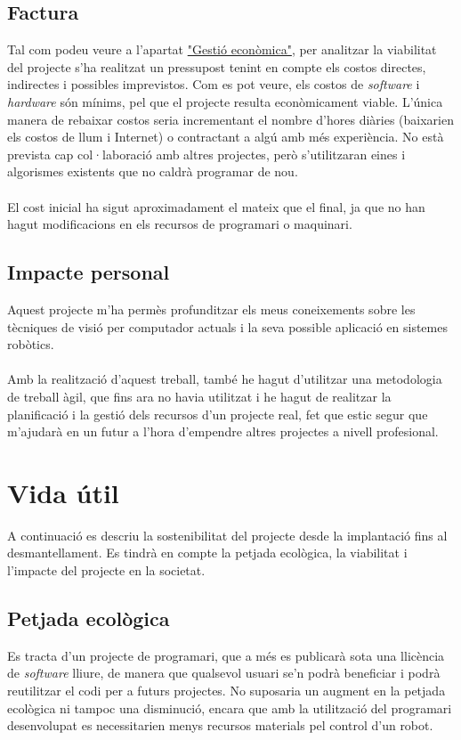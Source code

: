 	\subsection{Factura}
		Tal com podeu veure a l'apartat \hyperref[sec:Costos]{"Gestió econòmica"}, per analitzar la viabilitat del projecte s'ha realitzat un pressupost tenint en compte els costos directes, indirectes
		i possibles imprevistos. Com es pot veure, els costos de \textit{software} i \textit{hardware} són mínims, pel que el projecte resulta econòmicament viable.
		L'única manera de rebaixar costos seria incrementant el nombre d'hores diàries (baixarien els costos de llum i Internet) o contractant a algú amb més experiència.
		No està prevista cap col·laboració amb altres projectes, però s'utilitzaran eines i algorismes existents que no caldrà programar de nou.\\\\
		El cost inicial ha sigut aproximadament el mateix que el final, ja que no han hagut modificacions en els recursos de programari o maquinari.

	\subsection{Impacte personal}
		Aquest projecte m'ha permès profunditzar els meus coneixements sobre les tècniques de visió per computador actuals i la seva possible aplicació en sistemes robòtics.\\\\
		Amb la realització d'aquest treball, també he hagut d'utilitzar una metodologia de treball àgil, que fins ara no havia utilitzat i he hagut de realitzar la planificació i la gestió dels recursos
		d'un projecte real, fet que estic segur que m'ajudarà en un futur a l'hora d'empendre altres projectes a nivell profesional.

\section{Vida útil}
	A continuació es descriu la sostenibilitat del projecte desde la implantació fins al desmantellament. Es tindrà en compte la petjada ecològica, la viabilitat i l'impacte del projecte en la societat.
	\subsection{Petjada ecològica}
		Es tracta d'un projecte de programari, que a més es publicarà sota una llicència de \textit{software} lliure, de manera que qualsevol usuari se'n podrà beneficiar i podrà reutilitzar el
		codi per a futurs projectes. No suposaria un augment en la petjada ecològica ni tampoc una disminució, encara que amb la utilització del programari desenvolupat es necessitarien menys recursos materials
		pel control d'un robot.

